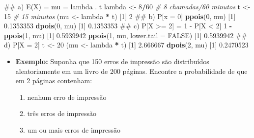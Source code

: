 \documentclass[10pt,a4paper]{book}
\newenvironment{Shaded}{\begin{snugshade}}{\end{snugshade}}
\newcommand{\KeywordTok}[1]{\textcolor[rgb]{0.13,0.29,0.53}{\textbf{#1}}}
\newcommand{\DataTypeTok}[1]{\textcolor[rgb]{0.13,0.29,0.53}{#1}}
\newcommand{\DecValTok}[1]{\textcolor[rgb]{0.00,0.00,0.81}{#1}}
\newcommand{\FloatTok}[1]{\textcolor[rgb]{0.00,0.00,0.81}{#1}}
\newcommand{\StringTok}[1]{\textcolor[rgb]{0.31,0.60,0.02}{#1}}
\newcommand{\CommentTok}[1]{\textcolor[rgb]{0.56,0.35,0.01}{\textit{#1}}}
\newcommand{\OtherTok}[1]{\textcolor[rgb]{0.56,0.35,0.01}{#1}}
\newcommand{\OperatorTok}[1]{\textcolor[rgb]{0.81,0.36,0.00}{\textbf{#1}}}
\newcommand{\NormalTok}[1]{#1}
\providecommand{\tightlist}{%
  \setlength{\itemsep}{0pt}\setlength{\parskip}{0pt}}
\begin{document}
\begin{Shaded}
\begin{Highlighting}[]
\NormalTok{## a) E(X) = mu = lambda . t}
\NormalTok{lambda <-}\StringTok{ }\DecValTok{8}\OperatorTok{/}\DecValTok{60} \CommentTok{# 8 chamadas/60 minutos}
\NormalTok{t <-}\StringTok{ }\DecValTok{15} \CommentTok{# 15 minutos}
\NormalTok{(mu <-}\StringTok{ }\NormalTok{lambda }\OperatorTok{*}\StringTok{ }\NormalTok{t)}
\NormalTok{[}\DecValTok{1}\NormalTok{] }\DecValTok{2}
\NormalTok{## b) P[x = 0]}
\KeywordTok{ppois}\NormalTok{(}\DecValTok{0}\NormalTok{, mu)}
\NormalTok{[}\DecValTok{1}\NormalTok{] }\FloatTok{0.1353353}
\KeywordTok{dpois}\NormalTok{(}\DecValTok{0}\NormalTok{, mu)}
\NormalTok{[}\DecValTok{1}\NormalTok{] }\FloatTok{0.1353353}
\NormalTok{## c) P[X >= 2] = 1 - P[X < 2]}
\DecValTok{1} \OperatorTok{-}\StringTok{ }\KeywordTok{ppois}\NormalTok{(}\DecValTok{1}\NormalTok{, mu)}
\NormalTok{[}\DecValTok{1}\NormalTok{] }\FloatTok{0.5939942}
\KeywordTok{ppois}\NormalTok{(}\DecValTok{1}\NormalTok{, mu, }\DataTypeTok{lower.tail =} \OtherTok{FALSE}\NormalTok{)}
\NormalTok{[}\DecValTok{1}\NormalTok{] }\FloatTok{0.5939942}
\NormalTok{## d) P[X = 2]}
\NormalTok{t <-}\StringTok{ }\DecValTok{20}
\NormalTok{(mu <-}\StringTok{ }\NormalTok{lambda }\OperatorTok{*}\StringTok{ }\NormalTok{t)}
\NormalTok{[}\DecValTok{1}\NormalTok{] }\FloatTok{2.666667}
\KeywordTok{dpois}\NormalTok{(}\DecValTok{2}\NormalTok{, mu)}
\NormalTok{[}\DecValTok{1}\NormalTok{] }\FloatTok{0.2470523}
\end{Highlighting}
\end{Shaded}

\begin{itemize}
\tightlist
\item
  \textbf{Exemplo:} Suponha que 150 erros de impressão são distribuídos
  aleatoriamente em um livro de 200 páginas. Encontre a probabilidade de
  que em 2 páginas contenham:

  \begin{enumerate}
  \def\labelenumi{\alph{enumi}.}
  \tightlist
  \item
    nenhum erro de impressão
  \item
    três erros de impressão
  \item
    um ou mais erros de impressão
  \end{enumerate}
\end{itemize}
\end{document}
